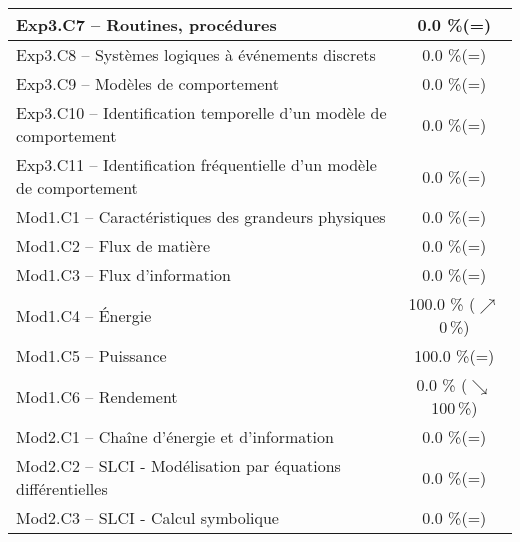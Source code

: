 \begin{center}
\begin{tabular}{|p{.7\linewidth}|c|}
Exp3.C7 -- Routines, procédures &0.0 \%(=)\\ \hline 
Exp3.C8 -- Systèmes logiques à événements discrets&0.0 \%(=)\\ \hline 
Exp3.C9 -- Modèles de comportement&0.0 \%(=)\\ \hline 
Exp3.C10 -- Identification temporelle d’un modèle de comportement&0.0 \%(=)\\ \hline 
Exp3.C11 -- Identification fréquentielle d’un modèle de comportement&0.0 \%(=)\\ \hline 
Mod1.C1 -- Caractéristiques des grandeurs physiques&0.0 \%(=)\\ \hline 
Mod1.C2 -- Flux de matière&0.0 \%(=)\\ \hline 
Mod1.C3 -- Flux d’information&0.0 \%(=)\\ \hline 
Mod1.C4 -- Énergie&100.0 \% ($\nearrow$ 0\,\%)\\ \hline 
Mod1.C5 -- Puissance&100.0 \%(=)\\ \hline 
Mod1.C6 -- Rendement&0.0 \% ($\searrow$ 100\,\%)\\ \hline 
Mod2.C1 -- Chaîne d’énergie et d'information&0.0 \%(=)\\ \hline 
Mod2.C2 -- SLCI - Modélisation par équations différentielles&0.0 \%(=)\\ \hline 
Mod2.C3 -- SLCI - Calcul symbolique&0.0 \%(=)\\ \hline 
\end{tabular} 
\end{center} 
\normalsize 
 
